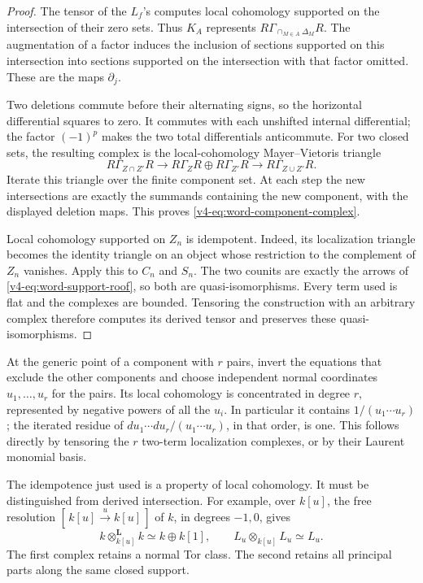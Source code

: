 \begin{proof}
The tensor of the \(L_f\)'s computes local cohomology supported
on the intersection of their zero sets. Thus \(K_A\) represents
\(R\Gamma_{\cap_{M\in A}\Delta_M}R\). The augmentation of a
factor induces the inclusion of sections supported on this
intersection into sections supported on the intersection with that
factor omitted. These are the maps \(\partial_j\).

Two deletions commute before their alternating signs, so the
horizontal differential squares to zero. It commutes with each
unshifted internal differential; the factor \((-1)^p\) makes the
two total differentials anticommute. For two closed sets, the
resulting complex is the local-cohomology Mayer--Vietoris triangle
\[
 R\Gamma_{Z\cap Z'}R\longrightarrow
 R\Gamma_ZR\oplus R\Gamma_{Z'}R
                 \longrightarrow R\Gamma_{Z\cup Z'}R.
\]
Iterate this triangle over the finite component set. At each step
the new intersections are exactly the summands containing the new
component, with the displayed deletion maps. This proves
\eqref{v4-eq:word-component-complex}.

Local cohomology supported on \(Z_n\) is idempotent. Indeed, its
localization triangle becomes the identity triangle on an object
whose restriction to the complement of \(Z_n\) vanishes.
Apply this to \(C_n\) and \(S_n\). The two counits are exactly
the arrows of \eqref{v4-eq:word-support-roof}, so both are
quasi-isomorphisms. Every term used is flat and the complexes are
bounded. Tensoring the construction with an arbitrary complex
therefore computes its derived tensor and preserves these
quasi-isomorphisms.
\end{proof}

At the generic point of a component with \(r\) pairs, invert the
equations that exclude the other components and choose independent
normal coordinates \(u_1,\ldots,u_r\) for the pairs. Its local
cohomology is concentrated in degree \(r\), represented by
negative powers of all the \(u_i\). In particular it contains
\(1/(u_1\cdots u_r)\); the iterated residue of
\(du_1\cdots du_r/(u_1\cdots u_r)\), in that order, is one.
This follows directly by tensoring the \(r\) two-term localization
complexes, or by their Laurent monomial basis.

The idempotence just used is a property of local cohomology.
It must be distinguished from derived intersection. For example,
over \(k[u]\), the free resolution
\([\,k[u]\xrightarrow{u}k[u]\,]\) of \(k\), in degrees
\(-1,0\), gives
\begin{equation}\label{v4-eq:word-derived-self-intersection}
 k\otimes_{k[u]}^{\mathbf L}k\simeq k\oplus k[1],
 \qquad
 L_u\otimes_{k[u]}L_u\simeq L_u.
\end{equation}
The first complex retains a normal Tor class. The second retains
all principal parts along the same closed support.

